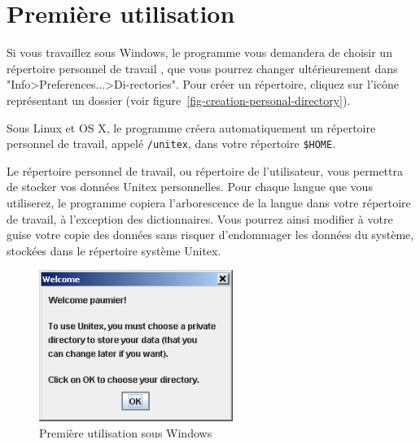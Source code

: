 



\section{Première utilisation}
\label{section-first-use}
Si vous travaillez sous Windows, le programme vous demandera de choisir un répertoire personnel de travail
, que vous pourrez changer ultérieurement dans
"Info>Preferences...>Di-rectories". Pour créer un répertoire, cliquez sur l’icône représentant un
dossier (voir figure~\ref{fig-creation-personal-directory}).

\bigskip
\noindent Sous Linux et OS X, le programme créera automatiquement un répertoire personnel de travail,
appelé \verb+/unitex+, dans votre répertoire \verb+$HOME+. 

\bigskip
\noindent Le répertoire personnel de travail, ou répertoire de l'utilisateur, vous permettra de stocker vos
données Unitex personnelles. Pour chaque langue que vous utiliserez, le
programme copiera l’arborescence de la langue dans votre répertoire de travail,
à l’exception des dictionnaires. Vous pourrez ainsi modifier à votre guise votre copie des données
sans risquer d’endommager les données du système, stockées dans le
répertoire système Unitex.


\begin{figure}[!ht]
\begin{center}
\includegraphics[width=6.3cm]{resources/img/fig1-1.png}
\caption{Première utilisation sous Windows}
\end{center}
\end{figure}

